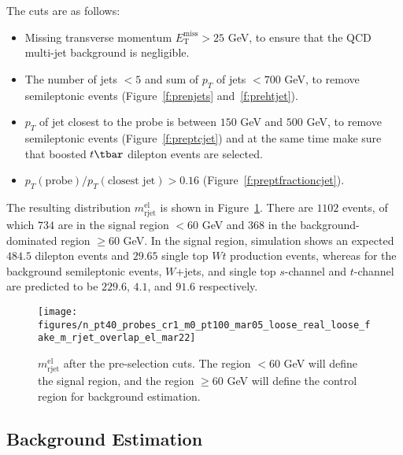 The cuts are as follows:

\begin{itemize}
	\item Missing transverse momentum $E_{\text{T}}^{\text{miss}} > 25$ GeV, 
	to ensure that the QCD multi-jet background is negligible.

	\item The number of jets $< 5$ and sum of $p_T$ of jets $< 700$ GeV, to remove
	      semileptonic events (Figure~\ref{f:prenjets} and~\ref{f:prehtjet}).


	\item $p_T$ of jet closest to the probe is between $150$ GeV and $500$ GeV, to
	      remove semileptonic events (Figure~\ref{f:preptcjet}) and at the
	      same time make sure that boosted $t\tbar$ dilepton events are selected.


	\item $p_T(\text{probe})  / p_T(\text{closest jet}) > 0.16 $ (Figure~\ref{f:preptfractioncjet}).

\end{itemize}

The resulting distribution $m_{\text{rjet}}^{\text{el}}$ is shown in
Figure~\ref{f:crmrjet}. There are $1102$ events, of which $734$ are in the
signal region $< 60$ GeV and $368$ in the background-dominated region $\geq 60$
GeV. In the signal region, simulation shows an expected $484.5$ dilepton events
and $29.65$ single top $Wt$ production events, whereas for the background
semileptonic events, $W$+jets, and single top $s$-channel and $t$-channel are
predicted to be $229.6$, $4.1$, and $91.6$ respectively.


\begin{figure}[H]
	\texttt{[image: figures/n\_pt40\_probes\_cr1\_m0\_pt100\_mar05\_loose\_real\_loose\_fake\_m\_rjet\_overlap\_el\_mar22]}
	\centering

	\caption{$m_{\text{rjet}}^{\text{el}}$ after the pre-selection cuts. The
		region $< 60$ GeV will define the signal region, and the region $\geq 60$ GeV
		will define the control region for background estimation.}

	\label{f:crmrjet}
\end{figure}

\subsection{Background Estimation}\label{s:eidbe}

